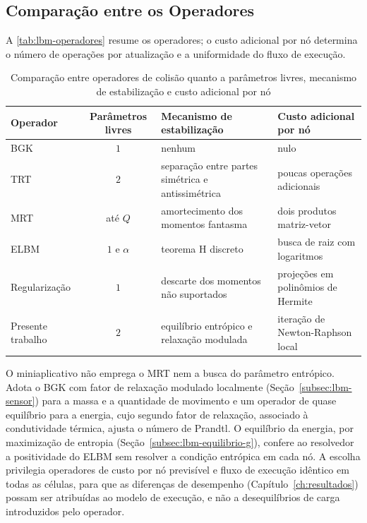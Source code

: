 
\subsection{Comparação entre os Operadores}\label{subsec:lbm-comparacao-operadores}

A \autoref{tab:lbm-operadores} resume os operadores; o custo adicional por nó determina o número de operações por atualização e a uniformidade do fluxo de execução.

\begin{table}[H]
    \centering
    \caption{Comparação entre operadores de colisão quanto a parâmetros livres, mecanismo de estabilização e custo adicional por nó}
    \label{tab:lbm-operadores}
    \begin{tabular}{lcp{4.0cm}p{3.6cm}}
        \toprule
        Operador & Parâmetros livres & Mecanismo de estabilização & Custo adicional por nó \\
        \midrule
        BGK              & $1$          & nenhum                                          & nulo                                   \\
        TRT              & $2$          & separação entre partes simétrica e antissimétrica & poucas operações adicionais            \\
        MRT              & até $Q$      & amortecimento dos momentos fantasma             & dois produtos matriz-vetor             \\
        ELBM             & $1$ e $\alpha$ & teorema H discreto                            & busca de raiz com logaritmos           \\
        Regularização    & $1$          & descarte dos momentos não suportados            & projeções em polinômios de Hermite     \\
        Presente trabalho & $2$         & equilíbrio entrópico e relaxação modulada       & iteração de Newton-Raphson local       \\
        \bottomrule
    \end{tabular}
\end{table}

O miniaplicativo não emprega o MRT nem a busca do parâmetro entrópico.
Adota o BGK com fator de relaxação modulado localmente (Seção~\ref{subsec:lbm-sensor}) para a massa e a quantidade de movimento e um operador de quase equilíbrio para a energia, cujo segundo fator de relaxação, associado à condutividade térmica, ajusta o número de Prandtl.
O equilíbrio da energia, por maximização de entropia (Seção~\ref{subsec:lbm-equilibrio-g}), confere ao resolvedor a positividade do ELBM sem resolver a condição entrópica em cada nó.
A escolha privilegia operadores de custo por nó previsível e fluxo de execução idêntico em todas as células, para que as diferenças de desempenho (Capítulo~\ref{ch:resultados}) possam ser atribuídas ao modelo de execução, e não a desequilíbrios de carga introduzidos pelo operador.


